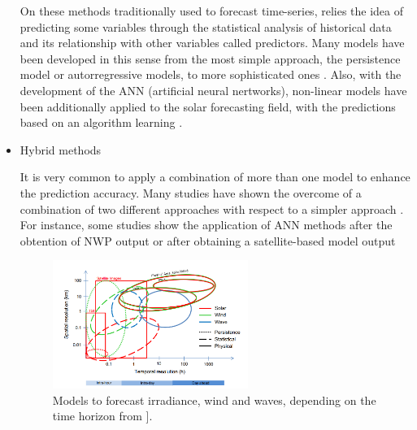 \begin{itemize}
On these methods traditionally used to forecast time-series, relies the idea of predicting some variables through the statistical analysis of historical data and its relationship with other variables called predictors. Many models have been developed in this sense from the most simple approach, the persistence model or autorregressive models, to more sophisticated ones \cite*{Reikard2009, bacher2009online, Inman2013}. Also, with the development of the ANN (artificial neural nertworks), non-linear models have been additionally applied to the solar forecasting field, with the predictions based on an algorithm learning \cite{Mellit2008}. 
 




\item{Hybrid methods}

It is very common to apply a combination of more than one model to enhance the prediction accuracy. Many studies have shown the overcome of a combination of two different approaches with respect to a simpler approach \cite*{Diagne2017, Yang2014}. For instance, some studies show the application of ANN methods after the obtention of NWP output \cite*{Cornaro2015} or after obtaining a satellite-based model output \cite*{Marquez2013} 


\begin{figure}[h!]
\centering\includegraphics[width=0.6\textwidth]{figs/widen2.png}
\caption[Irradiance, wind and wave, forecasting methods depending on the time horizon]{Models to forecast irradiance, wind and waves, depending on the time horizon from \cite*{Widen2015}].}
\label{fig:forecast}
\end{figure}



\end{itemize}
